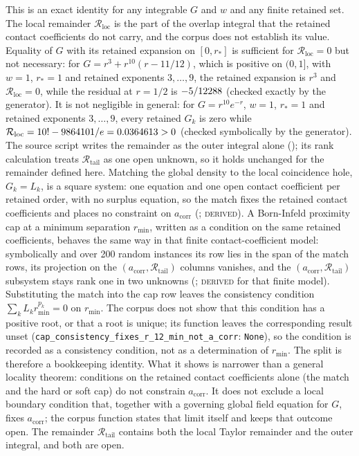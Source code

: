 \documentclass[aps,prd,onecolumn,amsmath,amssymb,longbibliography,floatfix,nofootinbib]{revtex4-2}
\newcommand{\acorr}{a_{\mathrm{corr}}}
\newcommand{\Rtail}{\mathcal{R}_{\mathrm{tail}}}
\newcommand{\st}[1]{\textsc{#1}}
\begin{document}
This is an exact identity for any integrable $G$ and $w$ and any finite retained set. The local remainder $\mathcal{R}_{\mathrm{loc}}$ is the part of the overlap integral that the retained contact coefficients do not carry, and the corpus does not establish its value. Equality of $G$ with its retained expansion on $[0,r_*]$ is sufficient for $\mathcal{R}_{\mathrm{loc}}=0$ but not necessary: for $G=r^3+r^{10}(r-11/12)$, which is positive on $(0,1]$, with $w=1$, $r_*=1$ and retained exponents $3,\dots,9$, the retained expansion is $r^3$ and $\mathcal{R}_{\mathrm{loc}}=0$, while the residual at $r=1/2$ is $-5/12288$ (checked exactly by the generator). It is not negligible in general: for $G=r^{10}e^{-r}$, $w=1$, $r_*=1$ and retained exponents $3,\dots,9$, every retained $G_k$ is zero while $\mathcal{R}_{\mathrm{loc}}=10!-9864101/e=0.0364613>0$ (checked symbolically by the generator). The source script writes the remainder as the outer integral alone (); its rank calculation treats $\Rtail$ as one open unknown, so it holds unchanged for the remainder defined here. Matching the global density to the local coincidence hole, $G_k=L_k$, is a square system: one equation and one open contact coefficient per retained order, with no surplus equation, so the match fixes the retained contact coefficients and places no constraint on $\acorr$ (; \st{derived}). A Born-Infeld proximity cap at a minimum separation $r_{\min}$, written as a condition on the same retained coefficients, behaves the same way in that finite contact-coefficient model: symbolically and over 200 random instances its row lies in the span of the match rows, its projection on the $(\acorr,\Rtail)$ columns vanishes, and the $(\acorr,\Rtail)$ subsystem stays rank one in two unknowns (; \st{derived} for that finite model). Substituting the match into the cap row leaves the consistency condition $\sum_kL_kr_{\min}^{p_k}=0$ on $r_{\min}$. The corpus does not show that this condition has a positive root, or that a root is unique; its function leaves the corresponding result unset (\texttt{cap\_consistency\_fixes\_r\_12\_min\_not\_a\_corr}: \texttt{None}), so the condition is recorded as a consistency condition, not as a determination of $r_{\min}$. The split is therefore a bookkeeping identity. What it shows is narrower than a general locality theorem: conditions on the retained contact coefficients alone (the match and the hard or soft cap) do not constrain $\acorr$. It does not exclude a local boundary condition that, together with a governing global field equation for $G$, fixes $\acorr$; the corpus function states that limit itself and keeps that outcome open. The remainder $\Rtail$ contains both the local Taylor remainder and the outer integral, and both are open.
\end{document}
